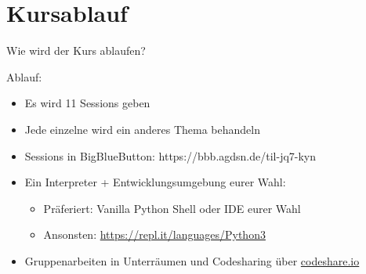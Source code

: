 \section{Kursablauf}
\begin{frame}{Wie wird der Kurs ablaufen?}
	
	Ablauf:
	\begin{itemize}
		\item Es wird 11 Sessions geben
		\item Jede einzelne wird ein anderes Thema behandeln
	\end{itemize}

	\pause
	\begin{itemize}
		\item Sessions in BigBlueButton: https://bbb.agdsn.de/til-jq7-kyn
		\item Ein Interpreter + Entwicklungsumgebung eurer Wahl:
		\begin{itemize}
			\item Präferiert: Vanilla Python Shell oder IDE eurer Wahl
			\item Ansonsten: \url{https://repl.it/languages/Python3}
		\end{itemize}
		\item Gruppenarbeiten in Unterräumen und Codesharing über \url{codeshare.io}
	\end{itemize}	
\end{frame}

